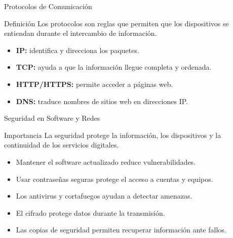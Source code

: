 \documentclass[10pt, aspectratio=169]{beamer}
\begin{document}
	\begin{frame}{Protocolos de Comunicación}
		\small
		\begin{block}{Definición}
			Los protocolos son reglas que permiten que los dispositivos se entiendan durante el intercambio de información.
		\end{block}
		
		\vspace{0.3cm}
		\begin{itemize}
			\item \textbf{IP:} identifica y direcciona los paquetes.
			\item \textbf{TCP:} ayuda a que la información llegue completa y ordenada.
			\item \textbf{HTTP/HTTPS:} permite acceder a páginas web.
			\item \textbf{DNS:} traduce nombres de sitios web en direcciones IP.
		\end{itemize}
	\end{frame}
	
	\begin{frame}{Seguridad en Software y Redes}
		\small
		\begin{block}{Importancia}
			La seguridad protege la información, los dispositivos y la continuidad de los servicios digitales.
		\end{block}
		
		\vspace{0.3cm}
		\begin{itemize}
			\item Mantener el software actualizado reduce vulnerabilidades.
			\item Usar contraseñas seguras protege el acceso a cuentas y equipos.
			\item Los antivirus y cortafuegos ayudan a detectar amenazas.
			\item El cifrado protege datos durante la transmisión.
			\item Las copias de seguridad permiten recuperar información ante fallos.
		\end{itemize}
	\end{frame}
	
\end{document}
